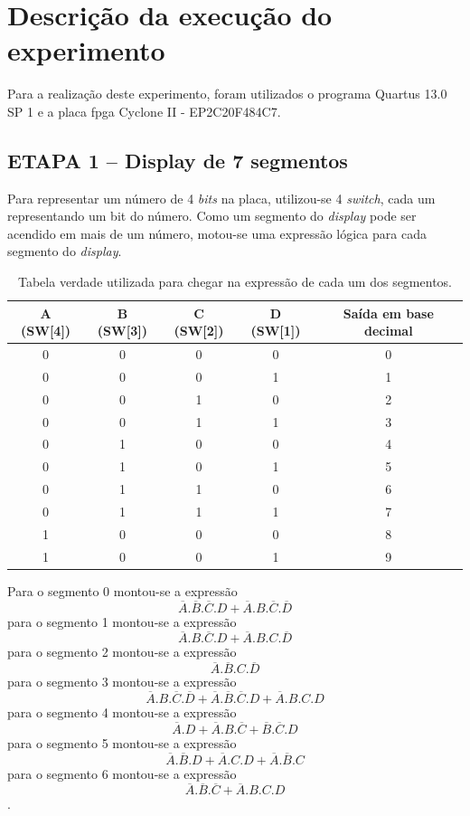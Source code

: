 
\chapter{Descrição da execução do experimento}

	Para a realização deste experimento, foram utilizados o programa Quartus 13.0 SP 1 e a placa \ac{fpga}
Cyclone II - EP2C20F484C7.

	\section{ETAPA 1 – Display de 7 segmentos}
		Para representar um número de 4 \textit{bits} na placa, utilizou-se 4 \textit{switch}, cada um
		representando um bit do número. Como um segmento do \textit{display} pode ser acendido
		em mais de um número,
		motou-se uma expressão lógica para cada segmento do \textit{display}.

		\begin{table}[h]
			\centering
			\caption{Tabela verdade utilizada para chegar na expressão de cada um dos segmentos.}
			\label{table:tabelaVerdade1}
			\begin{tabular}{c|c|c|c|c}
				\textbf{A (SW[4])} & \textbf{B (SW[3])} & \textbf{C (SW[2])} & \textbf{D (SW[1])} & \textbf{Saída em base decimal} \\
				\hline
				0 & 0 & 0 & 0 & 0\\
				0 & 0 & 0 & 1 & 1\\
				0 & 0 & 1 & 0 & 2\\
				0 & 0 & 1 & 1 & 3\\
				0 & 1 & 0 & 0 & 4\\
				0 & 1 & 0 & 1 & 5\\
				0 & 1 & 1 & 0 & 6\\
				0 & 1 & 1 & 1 & 7\\
				1 & 0 & 0 & 0 & 8\\
				1 & 0 & 0 & 1 & 9\\
			\end{tabular}
		\end{table}

		Para o segmento 0 montou-se a expressão
		$$\overline{A}.\overline{B}.\overline{C}.D+\overline{A}.B.\overline{C}.\overline{D}$$
		para o segmento 1 montou-se a expressão
		$$\overline{A}.B.\overline{C}.D+\overline{A}.B.C.\overline{D}$$
		para o segmento 2 montou-se a expressão
		$$\overline{A}.\overline{B}.C.\overline{D}$$
		para o segmento 3 montou-se a expressão
		$$\overline{A}.B.\overline{C}.\overline{D}+\overline{A}.\overline{B}.\overline{C}.D+\overline{A}.B.C.D$$
		para o segmento 4 montou-se a expressão
		$$\overline{A}.D+\overline{A}.B.\overline{C}+\overline{B}.\overline{C}.D$$
		para o segmento 5 montou-se a expressão
		$$\overline{A}.\overline{B}.D+\overline{A}.C.D+\overline{A}.\overline{B}.C$$
		para o segmento 6 montou-se a expressão
		$$\overline{A}.\overline{B}.\overline{C}+\overline{A}.B.C.D$$.


